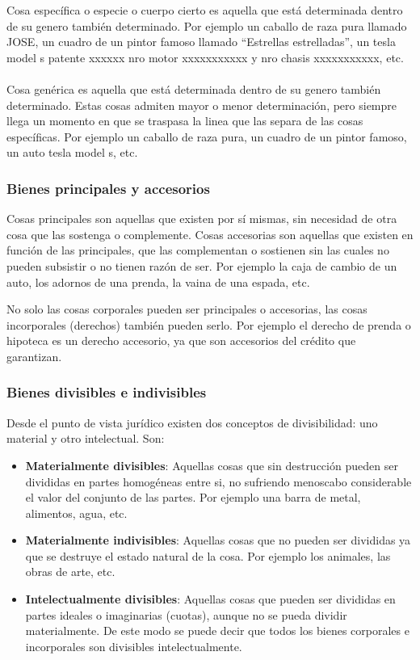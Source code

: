\documentclass{templateNote}
\begin{document}
Cosa específica o especie o cuerpo cierto es aquella que está determinada dentro de su genero también determinado. Por ejemplo un caballo de raza pura llamado JOSE, un cuadro de un pintor famoso llamado ``Estrellas estrelladas'', un tesla model s patente xxxxxx nro motor xxxxxxxxxxx y nro chasis xxxxxxxxxxx, etc.
\\\\
Cosa genérica es aquella que está determinada dentro de su genero también determinado. Estas cosas admiten mayor o menor determinación, pero siempre llega un momento en que se traspasa la linea que las separa de las cosas específicas. Por ejemplo un caballo de raza pura, un cuadro de un pintor famoso, un auto tesla model s, etc.

\subsubsection*{Bienes principales y accesorios}
Cosas principales son aquellas que existen por sí mismas, sin necesidad de otra cosa que las sostenga o complemente. 
Cosas accesorias son aquellas que existen en función de las principales, que las complementan o sostienen sin las cuales no pueden subsistir o no tienen razón de ser. Por ejemplo la caja de cambio de un auto, los adornos de una prenda, la vaina de una espada, etc.

No solo las cosas corporales pueden ser principales o accesorias, las cosas incorporales (derechos) también pueden serlo. Por ejemplo el derecho de prenda o hipoteca es un derecho accesorio, ya que son accesorios del crédito que garantizan.

\subsubsection*{Bienes divisibles e indivisibles}
Desde el punto de vista jurídico existen dos conceptos de divisibilidad: uno material y otro intelectual.
Son:
\begin{itemize}
    \item \textbf{Materialmente divisibles}: Aquellas cosas que sin destrucción pueden ser divididas en partes homogéneas entre si, no sufriendo menoscabo considerable el valor del conjunto de las partes. Por ejemplo una barra de metal, alimentos, agua, etc.
    \item \textbf{Materialmente indivisibles}: Aquellas cosas que no pueden ser divididas ya que se destruye el estado natural de la cosa. Por ejemplo los animales, las obras de arte, etc.
    \item \textbf{Intelectualmente divisibles}: Aquellas cosas que pueden ser divididas en partes ideales o imaginarias (cuotas), aunque no se pueda dividir materialmente. De este modo se puede decir que todos los bienes corporales e incorporales son divisibles intelectualmente.
\end{itemize}
\end{document}
